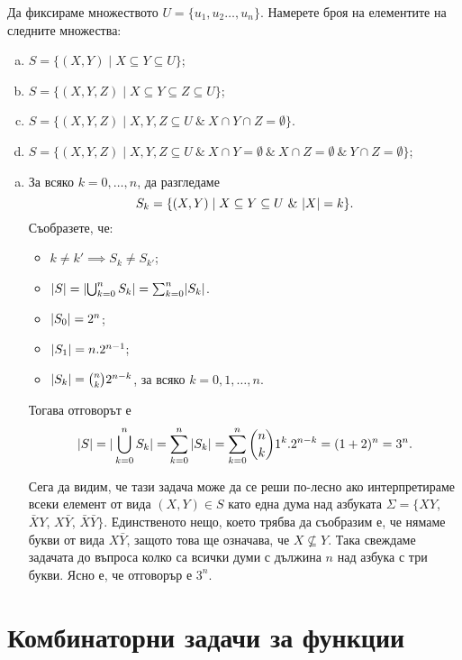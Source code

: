\begin{problem}
  Да фиксираме множеството $U = \{u_1,u_2\dots,u_n\}$.
  Намерете броя на елементите на следните множества:
  \begin{enumerate}[a)]
  \item 
    $S = \{(X,Y) \mid X \subseteq Y \subseteq U\}$;
  \item
    $S = \{(X,Y,Z) \mid X \subseteq Y \subseteq Z \subseteq U\}$;
  \item
    $S = \{(X,Y,Z) \mid X,Y,Z \subseteq U\ \&\ X \cap Y \cap Z = \emptyset\}$.
  \item
    $S = \{(X,Y,Z) \mid X,Y,Z \subseteq U\ \&\ X\cap Y = \emptyset\ \&\ X \cap Z = \emptyset\ \&\ Y \cap Z = \emptyset\}$;
  \end{enumerate}
\end{problem}
\begin{hint}
  \begin{enumerate}[a)]
  \item 
    За всяко $k = 0,\dots,n$, да разгледаме
    \[S_k = \{(X,Y) \mid X \subseteq Y \subseteq U\ \&\ \lvert{X}\rvert = k\}.\]
    Съобразете, че:
    \begin{itemize}
    \item 
      $k \neq k' \implies  S_k \neq S_{k'}$;
    \item
      $\lvert{S}\rvert = \lvert{\bigcup^n_{k=0} S_k}\rvert = \sum^n_{k=0}\lvert{S_k}\rvert$.
    \item
      $\lvert{S_0}\rvert = 2^n$;
    \item
      $\lvert{S_1}\rvert = n.2^{n-1}$;
    \item
      $\lvert{S_k}\rvert = \binom{n}{k}2^{n-k}$, за всяко $k = 0,1,\dots,n$.
    \end{itemize}
    Тогава отговорът е
    \[\lvert{S}\rvert = |\bigcup^n_{k=0} S_k| = \sum^n_{k=0} |S_k| = \sum^n_{k=0} \binom{n}{k}1^k.2^{n-k} = (1+2)^n = 3^n.\]
    
    Сега да видим, че тази задача може да се реши по-лесно ако интерпретираме всеки елемент от вида $(X,Y) \in S$
    като една дума над азбуката $\Sigma = \{XY$, $\bar{X}Y$, $X\bar{Y}$, $\bar{X}\bar{Y}\}$.
    Единственото нещо, което трябва да съобразим е, че нямаме букви от вида $X\bar{Y}$, защото това ще означава, че 
    $X \not\subseteq Y$. Така свеждаме задачата до въпроса колко са всички думи с дължина $n$ над азбука с три букви.
    Ясно е, че отговорър е $3^n$.
  \end{enumerate}
\end{hint}


\section{Комбинаторни задачи за функции}


